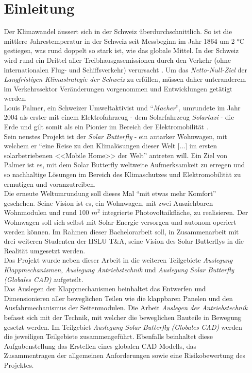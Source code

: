 \section{Einleitung}
Der Klimawandel äussert sich in der Schweiz überdurchschnittlich. So ist die mittlere Jahrestemperatur in der Schweiz seit Messbeginn im Jahr 1864 um 2 °C gestiegen, was rund doppelt so stark ist, wie das globale Mittel. In der Schweiz wird rund ein Drittel aller Treibhausgasemissionen durch den Verkehr (ohne internationalen Flug- und Schiffsverkehr) verursacht \cite{BAFU}. Um das \emph{Netto-Null-Ziel} der \emph{Langfristigen Klimastrategie der Schweiz} zu erfüllen, müssen daher unteranderem im Verkehrssektor Veränderungen vorgenommen und Entwicklungen getätigt werden.\\
Louis Palmer, ein Schweizer Umweltaktivist und ``\emph{Macher}'', umrundete im Jahr 2004 als erster mit einem Elektrofahrzeug - dem Solarfahrzeug \emph{Solartaxi} - die Erde und gilt somit als ein Pionier im Bereich der Elektromobilität \cite{Palmer}.\\
Sein neustes Projekt ist der \emph{Solar Butterfly} - ein autarker Wohnwagen, mit welchem er ``eine Reise zu den Klimalösungen dieser Welt [...] im ersten solarbetriebenen <<Mobile Home>> der Welt'' antreten will. Ein Ziel von Palmer ist es, mit dem Solar Butterfly weltweite Aufmerksamkeit zu erregen und so nachhaltige Lösungen im Bereich des Klimaschutzes und Elektromobilität zu ermutigen und voranzutreiben.\\
Die erneute Weltumrundung soll dieses Mal ``mit etwas mehr Komfort'' geschehen. Seine Vision ist es, ein Wohnwagen, mit zwei Ausziehbaren Wohnmodulen und rund 100 $m^2$ integrierte Photovoltaikfläche, zu realisieren. Der Wohnwagen soll sich selbst mit Solar-Energie versorgen und autonom operiert werden können. Im Rahmen dieser Bachelorarbeit soll, in Zusammenarbeit mit drei weiteren Studenten der HSLU T\&A, seine Vision des Solar Butterflys in die Realität umgesetzt werden.\\
Das Projekt wurde neben dieser Arbeit in die weiteren Teilgebiete \emph{Auslegung Klappmechanismen}, \emph{Auslegung Antriebstechnik} und \emph{Auslegung Solar Butterfly (Globales CAD)} aufgeteilt.\\
Das Auslegen der Klappmechanismen beinhaltet das Entwerfen und Dimensionieren aller beweglichen Teilen wie die klappbaren Panelen und den Ausfahrmechanismus der Seitenmodulen. Die Arbeit \emph{Auslegen der Antriebstechnik} befasst sich mit der Technik, mit welcher die beweglichen Bauteile in Bewegung gesetzt werden. Im Teilgebiet \emph{Auslegung Solar Butterfly (Globales CAD)} werden die jeweiligen Teilgebiete zusammengeführt. Ebenfalls beinhaltet diese Aufgabenstellung das Erstellen eines globalen CAD-Modells, das Zusammentragen der allgemeinen Anforderungen sowie eine Risikobewertung des Projektes.\\


